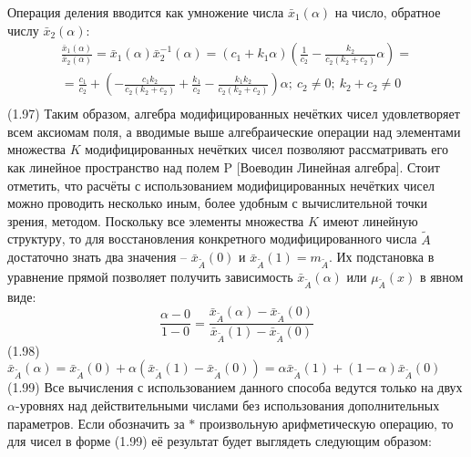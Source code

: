 Операция деления вводится как умножение числа ${{\bar{x}}_{1}}\left( \alpha  \right)$ на число, обратное числу ${{\bar{x}}_{2}}\left( \alpha  \right)$:
	\[\begin{matrix}
  \frac{{{{\bar{x}}}_{1}}\left( \alpha  \right)}{{{{\bar{x}}}_{2}}\left( \alpha  \right)}={{{\bar{x}}}_{1}}\left( \alpha  \right)\bar{x}_{2}^{-1}\left( \alpha  \right)=\left( {{c}_{1}}+{{k}_{1}}\alpha  \right)\left( \frac{1}{{{c}_{2}}}-\frac{{{k}_{2}}}{{{c}_{2}}\left( {{k}_{2}}+{{c}_{2}} \right)}\alpha  \right)= \\ 
  =\frac{{{c}_{1}}}{{{c}_{2}}}+\left( -\frac{{{c}_{1}}{{k}_{2}}}{{{c}_{2}}\left( {{k}_{2}}+{{c}_{2}} \right)}+\frac{{{k}_{1}}}{{{c}_{2}}}-\frac{{{k}_{1}}{{k}_{2}}}{{{c}_{2}}\left( {{k}_{2}}+{{c}_{2}} \right)} \right)\alpha ;\ {{c}_{2}}\ne 0;\ {{k}_{2}}+{{c}_{2}}\ne 0 \\ 
\end{matrix}\] 	(1.97)
Таким образом, алгебра модифицированных нечётких чисел удовлетворяет всем аксиомам поля, а вводимые выше алгебраические операции над элементами множества $K$ модифицированных нечётких чисел позволяют рассматривать его как линейное пространство над полем P [Воеводин Линейная алгебра].
Стоит отметить, что расчёты с использованием модифицированных нечётких чисел можно проводить несколько иным, более удобным с вычислительной точки зрения, методом. Поскольку все элементы множества $K$ имеют линейную структуру, то для восстановления конкретного модифицированного числа $\tilde{A}$ достаточно знать два значения – ${{\bar{x}}_{{\tilde{A}}}}\left( 0 \right)$ и ${{\bar{x}}_{{\tilde{A}}}}\left( 1 \right)={{m}_{{\tilde{A}}}}$. Их подстановка в уравнение прямой позволяет получить зависимость ${{\bar{x}}_{{\tilde{A}}}}\left( \alpha  \right)$ или ${{\mu }_{{\tilde{A}}}}\left( x \right)$ в явном виде:
	\[\frac{\alpha -0}{1-0}=\frac{{{{\bar{x}}}_{{\tilde{A}}}}\left( \alpha  \right)-{{{\bar{x}}}_{{\tilde{A}}}}\left( 0 \right)}{{{{\bar{x}}}_{{\tilde{A}}}}\left( 1 \right)-{{{\bar{x}}}_{{\tilde{A}}}}\left( 0 \right)}\] 	(1.98)
	${{\bar{x}}_{{\tilde{A}}}}\left( \alpha  \right)={{\bar{x}}_{{\tilde{A}}}}\left( 0 \right)+\alpha \left( {{{\bar{x}}}_{{\tilde{A}}}}\left( 1 \right)-{{{\bar{x}}}_{{\tilde{A}}}}\left( 0 \right) \right)=\alpha {{\bar{x}}_{{\tilde{A}}}}\left( 1 \right)+\left( 1-\alpha  \right){{\bar{x}}_{{\tilde{A}}}}\left( 0 \right)$ 	(1.99)
Все вычисления с использованием данного способа ведутся только на двух $\alpha $-уровнях над действительными числами без использования дополнительных параметров. Если обозначить за $*$ произвольную арифметическую операцию, то для чисел в форме (1.99) её результат будет выглядеть следующим образом:
